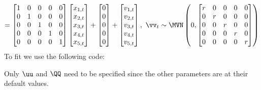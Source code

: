 \begin{gather*}
= \begin{bmatrix}1&0&0&0&0\\0&1&0&0&0\\0&0&1&0&0\\0&0&0&1&0\\0&0&0&0&1\end{bmatrix}
\begin{bmatrix}x_{1,t}\\x_{2,t}\\x_{3,t}\\x_{4,t}\\x_{5,t}\end{bmatrix}
+ \begin{bmatrix}0\\0\\0\\0\\0\end{bmatrix}
+ \begin{bmatrix}v_{1,t}\\ v_{2,t}\\ v_{3,t}\\ v_{4,t}\\ v_{5,t}\end{bmatrix},
 \textrm{ } \vv_t \sim \MVN\begin{pmatrix} 0,\begin{bmatrix}r&0&0&0&0\\0&r&0&0&0\\0&0&r&0&0\\0&0&0&r&0\\0&0&0&0&r\end{bmatrix} \end{pmatrix}  \\
\end{gather*}
To fit we use the following code:  

Only $\uu$ and $\QQ$ need to be specified since the other parameters are at their default values.  

